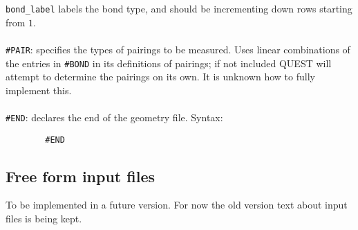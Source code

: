 \documentclass[12pt]{article}
\begin{document}
        \texttt{bond\_label} labels the bond type, and should be incrementing down rows starting from $1$. \\
        \\
        \texttt{\#PAIR}: specifies the types of pairings to be measured.
        Uses linear combinations of the entries in \texttt{\#BOND} in its definitions of pairings; if not included QUEST will attempt to determine the pairings on its own.
        It is unknown how to fully implement this. \\
        \\
        \texttt{\#END}: declares the end of the geometry file.
        Syntax:
        \begin{verbatim}
        #END
        \end{verbatim}

        \subsection{Free form input files}
        To be implemented in a future version.
        For now the old version text about input files is being kept.
\end{document}
